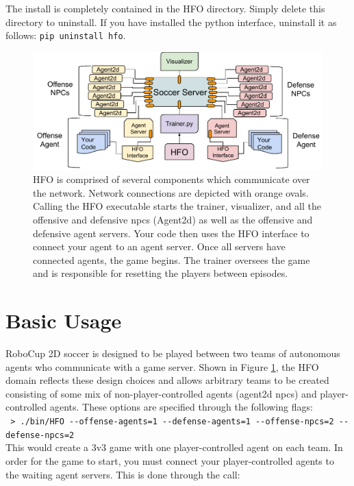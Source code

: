 \documentclass[12pt]{article}
\begin{document}
The install is completely contained in the HFO directory. Simply
delete this directory to uninstall. If you have installed the python
interface, uninstall it as follows: \verb+pip uninstall hfo+.

\begin{figure}[htp]
  \centering
  \includegraphics[width=\textwidth]{figures/HFODiagram}
  \caption{HFO is comprised of several components which communicate
    over the network. Network connections are depicted with orange
    ovals. Calling the HFO executable starts the trainer, visualizer,
    and all the offensive and defensive npcs (Agent2d) as well as the
    offensive and defensive agent servers. Your code then uses the HFO
    interface to connect your agent to an agent server. Once all
    servers have connected agents, the game begins. The trainer
    oversees the game and is responsible for resetting the players
    between episodes.}
  \label{fig:hfo}
\end{figure}

\section{Basic Usage}

RoboCup 2D soccer is designed to be played between two teams of
autonomous agents who communicate with a game server. Shown in Figure
\ref{fig:hfo}, the HFO domain reflects these design choices and allows
arbitrary teams to be created consisting of some mix of
non-player-controlled agents (agent2d npcs) and player-controlled
agents. These options are specified through the following flags:\\

\noindent
\verb+ > ./bin/HFO --offense-agents=1 --defense-agents=1 --offense-npcs=2 --defense-npcs=2+\\

This would create a 3v3 game with one player-controlled agent on
each team. In order for the game to start, you must connect your
player-controlled agents to the waiting agent servers. This is done
through the call:\\
\end{document}
